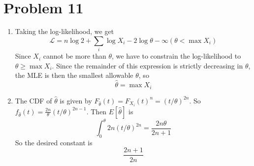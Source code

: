 \documentclass[10pt,letter]{article}
\begin{document}
\section*{Problem 11}
\begin{enumerate}[label=(\alph*)]
\item Taking the log-likelihood, we get
\[ \mathcal{L} = n \log 2 + \sum_i \log X_i - 2\log \theta - \infty(\theta < \max X_i) \]
Since $X_i$ cannot be more than $\theta$, we have to constrain the log-likelihood to $\theta \ge \max X_i$. Since the remainder of this expression is strictly decreasing in $\theta$, the MLE is then the smallest allowable $\theta$, so
\[ \hat{\theta} = \max X_i \]

\item The CDF of $\hat{\theta}$ is given by $F_{\hat{\theta}}(t) = F_{X_i}(t)^n = (t/\theta)^{2n}$. So $f_{\hat{\theta}}(t) = \frac{2n}{\theta}(t/\theta)^{2n-1}$.
Then $E[\hat{\theta}]$ is
\[ \int_0^\theta 2n (t/\theta)^{2n} = \frac{2n\theta}{2n+1} \]
So the desired constant is
\[ \frac{2n+1}{2n} \]
\end{enumerate}
\end{document}
